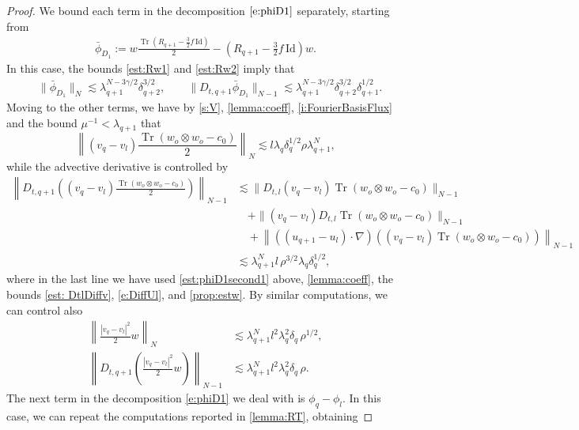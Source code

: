 \documentclass[10pt,a4paper]{amsart}
\numberwithin{equation}{section}
\numberwithin{corollario}{section}
\numberwithin{lemma}{section}
\numberwithin{prop}{section}
\theoremstyle{definition}
\theoremstyle{remark}
\newcommand{\Id}{\mathrm{Id}}
\DeclareMathOperator{\Tr}{Tr}
\newcommand{\qq}{_{q+1}}
\begin{document}
\begin{proof}
We bound each term in the decomposition $\eqref{e:phiD1}$ separately, starting from
\begin{align}
\bar{\phi}_{D_1}:=w\frac{\Tr(R\qq-\frac{3}{2}f\,\Id)}{2}-\left(R\qq-\frac{3}{2}f\,\Id\right)w.
\end{align}
In this case, the bounds \eqref{est:Rw1} and \eqref{est:Rw2} imply that
    \begin{align}\label{est:phiD1first}
        &\|\bar{\phi}_{D_1}\|_N
        \lesssim 
        \lambda\qq ^{N-3\gamma/2}\delta_{q+2}^{3/2},
        \qquad 
        \|D_{t,q+1}\bar{\phi}_{D_1}\|_{N-1}
        \lesssim 
        \lambda\qq ^{N-3\gamma/2}\delta_{q+2}^{3/2}\delta\qq^{1/2}.
    \end{align}
Moving to the other terms, we have by \eqref{s:V}, \autoref{lemma:coeff}, \eqref{i:FourierBasisFlux} and the bound $\mu^{-1} < \lambda\qq$ that 
\begin{equation}\label{est:phiD1second1}
    \left\|(v_q-v_l)\frac{\Tr(w_o \otimes w_o-c_0)}{2}\right\|_N\lesssim   l\lambda_q\delta_q^{1/2}\rho \lambda\qq^{N},
\end{equation}
while the advective derivative is controlled by 
    \begin{align}\label{est:phiD1second2} 
        \left\|D_{t,q+1}\left( (v_q-v_l)\frac{\Tr(w_o \otimes w_o-c_0)}{2}\right) \right\|_{N-1}
        &\lesssim 
        \|D_{t,l}(v_q-v_l) \Tr(w_o \otimes w_o-c_0) \|_{N-1}\\
        &\quad+\|(v_q-v_l) D_{t,l} \Tr(w_o \otimes w_o-c_0) \|_{N-1}\\
        &\quad+
        \left\|((u\qq-u_l)\cdot \nabla) \left( (v_q-v_l) \Tr(w_o \otimes w_o-c_0) \right) \right\|_{N-1}\\
        &\lesssim \lambda\qq^N l\, \rho^{3/2}\lambda_q\delta_q^{1/2},
    \end{align}
where in the last line we have used \eqref{est:phiD1second1} above, \autoref{lemma:coeff}, the bounds \eqref{est: DtlDiffv}, \eqref{e:DiffUl}, and \autoref{prop:estw}. 
By similar computations, we can control also
\begin{align}
    \left\|\frac{|v_q-v_l|^2}{2}w\right\|_N
    &\lesssim 
    \lambda\qq ^Nl^2\lambda_q^2\delta_q\,\rho^{1/2},\\
    \left\|D_{t,q+1}\left(\frac{|v_q-v_l|^2}{2}w\right)\right\|_{N-1}
    &\lesssim 
    \lambda\qq ^Nl^2\lambda_q^2\delta_q\,\rho.
\end{align}
The next term in the decomposition \eqref{e:phiD1} we deal with is $\phi_q-\phi_l$. In this case, we can repeat the computations reported in \autoref{lemma:RT}, obtaining

\end{proof}
\end{document}
